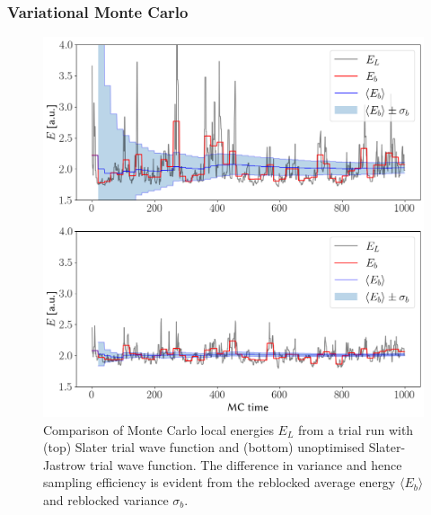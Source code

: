 \documentclass[final,3p,times,twocolumn]{elsarticle}
\begin{document}
	\subsubsection{Variational Monte Carlo}
	\begin{figure}[h]
	\centering
	\includegraphics[width=\linewidth]{../plots/blocking.png}
	\caption{Comparison of Monte Carlo local energies $E_L$ from a trial run with (top) Slater trial wave function and (bottom) unoptimised Slater-Jastrow trial wave function. The difference in variance and hence sampling efficiency is evident from the reblocked average energy $\langle E_b \rangle$ and reblocked variance $\sigma_b$.}
	\label{fig:blocking+jast}
	\end{figure}
\end{document}
